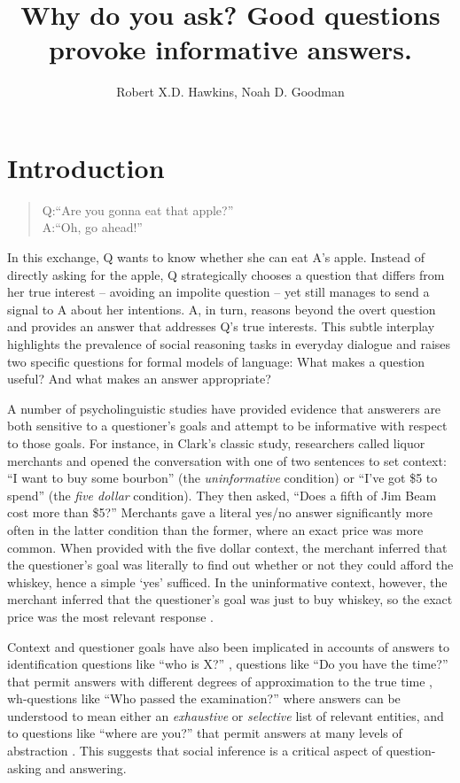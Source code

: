 \documentclass[12pt, floatsintext, man]{apa6}
\title{Why do you ask? Good questions provoke informative answers.}
\author{Robert X.D. Hawkins, Noah D. Goodman}
\affiliation{Stanford University}
\begin{document}
\maketitle
\section{Introduction}

\begin{quote}
Q:``Are you gonna eat that apple?''\\ A:``Oh, go ahead!''
\end{quote}

In this exchange, Q wants to know whether she can eat A's apple. Instead of directly asking for the apple, Q strategically chooses a question that differs from her true interest -- avoiding an impolite question -- yet still manages to send a signal to A about her intentions. A, in turn, reasons beyond the overt question and provides an answer that addresses Q's true interests. This subtle interplay highlights the prevalence of social reasoning tasks in everyday dialogue and raises two specific questions for formal models of language:
What makes a question useful? And what makes an answer appropriate? 

A number of psycholinguistic studies have provided evidence that answerers are both sensitive to a questioner's goals and attempt to be informative with respect to those goals.
For instance, in Clark's \citeyear{Clark79_IndirectSpeechActs} classic study, researchers called liquor merchants and opened the conversation with one of two sentences to set context: ``I want to buy some bourbon'' (the \emph{uninformative} condition) or ``I've got \$5 to spend'' (the \emph{five dollar} condition). They then asked, ``Does a fifth of Jim Beam cost more than \$5?'' Merchants gave a literal yes/no answer significantly more often in the latter condition than the former, where an exact price was more common. When provided with the five dollar context, the merchant inferred that the questioner's goal was literally to find out whether or not they could afford the whiskey, hence a simple `yes'  sufficed. In the uninformative context, however, the merchant inferred that the questioner's goal was just to buy whiskey, so the exact price was the most relevant response \cite{Clark79_IndirectSpeechActs}. 

Context and questioner goals have also been implicated in accounts of answers to identification questions like ``who is X?'' \cite{BoerLycan75_KnowingWho}, questions like ``Do you have the time?'' that permit answers with different degrees of approximation to the true time \cite{DerHenstCarlesSperber02_RelevanceTellingTime, GibbsBryant08_OptimalRelevance}, wh-questions like ``Who passed the examination?'' where answers can be understood to mean either an \emph{exhaustive} or \emph{selective} list of relevant entities, and to questions like ``where are you?'' that permit answers at many levels of abstraction \cite{Potts12_CardsDialogueCorpus}. This suggests that social inference is a critical aspect of question-asking and answering. %
\end{document}
